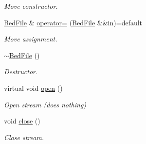\begin{DoxyCompactItemize}
\begin{DoxyCompactList}\small\item\em Move constructor. \end{DoxyCompactList}\item 
\mbox{\label{classvarfiles_1_1_bed_file_a4bbcda06f28e69bda83d69aef4772600}} 
\hyperlink{classvarfiles_1_1_bed_file}{Bed\+File} \& \hyperlink{classvarfiles_1_1_bed_file_a4bbcda06f28e69bda83d69aef4772600}{operator=} (\hyperlink{classvarfiles_1_1_bed_file}{Bed\+File} \&\&in)=default
\begin{DoxyCompactList}\small\item\em Move assignment. \end{DoxyCompactList}\item 
\mbox{\label{classvarfiles_1_1_bed_file_a8e6b512579968f51763ac693c1c4432b}} 
\hyperlink{classvarfiles_1_1_bed_file_a8e6b512579968f51763ac693c1c4432b}{$\sim$\+Bed\+File} ()
\begin{DoxyCompactList}\small\item\em Destructor. \end{DoxyCompactList}\item 
\mbox{\label{classvarfiles_1_1_bed_file_ac0c3f99521807ca8a9e7970509c13f01}} 
virtual void \hyperlink{classvarfiles_1_1_bed_file_ac0c3f99521807ca8a9e7970509c13f01}{open} ()
\begin{DoxyCompactList}\small\item\em Open stream (does nothing) \end{DoxyCompactList}\item 
\mbox{\label{classvarfiles_1_1_bed_file_acc8796c6ea50710287b0e2117c4b381e}} 
void \hyperlink{classvarfiles_1_1_bed_file_acc8796c6ea50710287b0e2117c4b381e}{close} ()
\begin{DoxyCompactList}\small\item\em Close stream. \end{DoxyCompactList}\end{DoxyCompactItemize}
